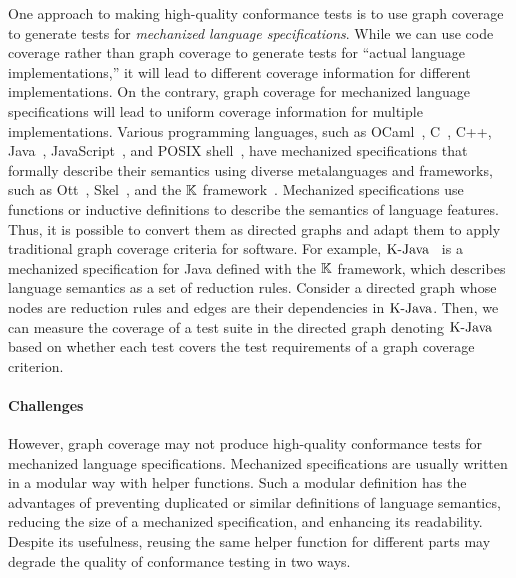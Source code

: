 
One approach to making high-quality conformance tests is to use graph coverage
to generate tests for \textit{mechanized language specifications}.
%
While we can use code coverage rather than graph coverage
to generate tests for ``actual language implementations,''
it will lead to different coverage information for different implementations.
On the contrary, graph coverage for mechanized language specifications
will lead to uniform coverage information for multiple implementations.
%
Various programming languages, such as OCaml~\cite{ocaml-light-spec},
C~\cite{c-light-spec}, C++\cite{cpp-spec}, Java~\cite{k-java},
JavaScript~\cite{jiset}, and POSIX shell~\cite{posix-shell-spec},
have mechanized specifications that formally describe their
semantics using diverse metalanguages and frameworks, such as Ott~\cite{ott}, Skel~\cite{skel}, and the
$\mathbb{K}$ framework~\cite{kframework}.
%
Mechanized specifications use functions or inductive definitions to describe the
semantics of language features. Thus, it is possible to convert them as directed
graphs and adapt them to apply traditional graph coverage criteria for software.
For example, $\text{K-Java}$~\cite{k-java} is a mechanized specification for Java
defined with the $\mathbb{K}$ framework, which describes language semantics
as a set of reduction rules.
Consider a directed graph whose nodes are reduction rules and edges are
their dependencies in $\text{K-Java}$.
Then, we can measure the coverage of a test suite in the directed graph denoting $\text{K-Java}$
based on whether each test covers the test requirements of a graph coverage criterion.


\paragraph{\textbf{Challenges}}
However, graph coverage may not produce high-quality conformance tests
for mechanized language specifications.
Mechanized specifications are usually written in a modular way with helper functions.
Such a modular definition has the advantages of preventing duplicated or similar
definitions of language semantics, reducing the size of a mechanized
specification, and enhancing its readability.
Despite its usefulness, reusing the same helper function for different parts
may degrade the quality of conformance testing in two ways.


